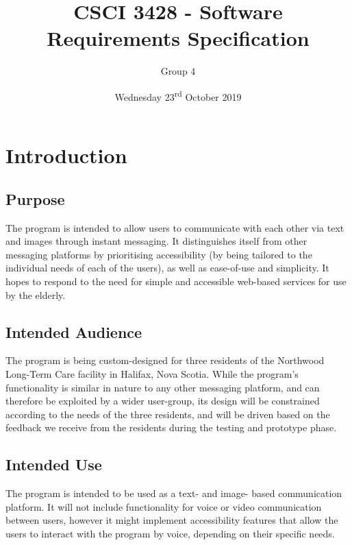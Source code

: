 \documentclass[11pt]{article}
\renewcommand{\headrulewidth}{.3pt}
\renewcommand{\footrulewidth}{.3pt}
\begin{document}
\title{CSCI 3428 - Software Requirements Specification}
\author{Group 4}
\date{Wednesday 23\textsuperscript{rd} October 2019}
\maketitle

\fancypagestyle{plain}{
\fancyhf{} %
\fancyfoot[r]{\footnotesize \thepage} %
\fancyfoot[l]{\small\scshape SRS} %
\renewcommand{\headrulewidth}{0pt}
\renewcommand{\footrulewidth}{.3pt}}

\section{Introduction}
\subsection{Purpose}
The program is intended to allow users to communicate with each other via text and images through
instant messaging. It distinguishes itself from other messaging platforms by prioritising
accessibility (by being tailored to the individual needs of each of the users), as well as
ease-of-use and simplicity. It hopes to respond to the need for simple and accessible web-based
services for use by the elderly.

\subsection{Intended Audience}
The program is being custom-designed for three residents of the Northwood Long-Term Care
facility in Halifax, Nova Scotia. While the program's functionality is similar in nature to any
other messaging platform, and can therefore be exploited by a wider user-group, its design will be
constrained according to the needs of the three residents, and will be driven based on the feedback
we receive from the residents during the testing and prototype phase.

\subsection{Intended Use}
The program is intended to be used as a text- and image- based communication platform. It will not
include functionality for voice or video communication between users, however it might implement
accessibility features that allow the users to interact with the program by voice, depending on
their specific needs.
\end{document}
